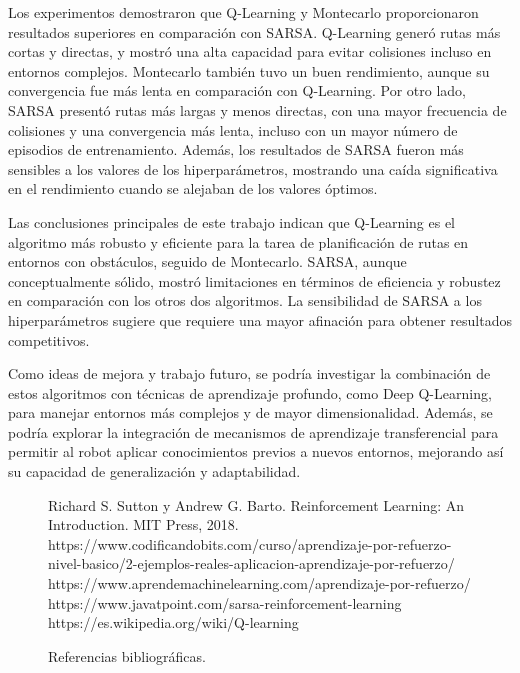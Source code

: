 \documentclass[conference,a4paper]{IEEEtran}
\begin{document}
Los experimentos demostraron que Q-Learning y Montecarlo proporcionaron resultados superiores en comparación con SARSA. Q-Learning generó rutas más cortas y directas, y mostró una alta 
capacidad para evitar colisiones incluso en entornos complejos. Montecarlo también tuvo un buen rendimiento, aunque su convergencia fue más lenta en comparación con Q-Learning. Por otro lado,
SARSA presentó rutas más largas y menos directas, con una mayor frecuencia de colisiones y una convergencia más lenta, incluso con un mayor número de episodios de entrenamiento.
Además, los resultados de SARSA fueron más sensibles a los valores de los hiperparámetros, mostrando una caída significativa en el rendimiento cuando se alejaban de los valores óptimos.\newline

Las conclusiones principales de este trabajo indican que Q-Learning es el algoritmo más robusto y eficiente para la tarea de planificación de rutas en entornos con obstáculos, seguido de Montecarlo. 
SARSA, aunque conceptualmente sólido, mostró limitaciones en términos de eficiencia y robustez en comparación con los otros dos algoritmos. La sensibilidad de SARSA a los hiperparámetros sugiere que 
requiere una mayor afinación para obtener resultados competitivos.\newline

Como ideas de mejora y trabajo futuro, se podría investigar la combinación de estos algoritmos con técnicas de aprendizaje profundo, como Deep Q-Learning, para manejar entornos más complejos y
de mayor dimensionalidad. Además, se podría explorar la integración de mecanismos de aprendizaje transferencial para permitir al robot aplicar conocimientos previos a nuevos entornos, mejorando
así su capacidad de generalización y adaptabilidad.

\begin{figure}[h!]
  \begin{thebibliography}{99}
   Richard S. Sutton y Andrew G. Barto. Reinforcement Learning: An Introduction.
  MIT Press, 2018.
   https://www.codificandobits.com/curso/aprendizaje-por-refuerzo-nivel-basico/2-ejemplos-reales-aplicacion-aprendizaje-por-refuerzo/
   https://www.aprendemachinelearning.com/aprendizaje-por-refuerzo/
   https://www.javatpoint.com/sarsa-reinforcement-learning
   https://es.wikipedia.org/wiki/Q-learning
  \end{thebibliography}
  \caption{Referencias bibliográficas.}
  \label{fig:bibliography}
  \end{figure}
  
\end{document}
